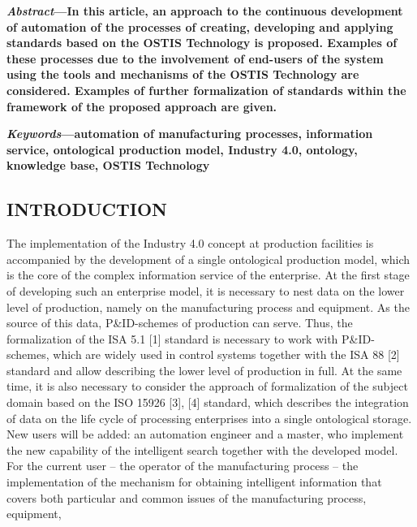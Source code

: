 \documentclass[12pt]{article}
\begin{document}
\begin{multicols}{2}
\setlength\parindent{1.5em}
\footnotesize{\textbf{\textit{Abstract}—In this article, an approach to the continuous
development of automation of the processes of creating,
developing and applying standards based on the OSTIS
Technology is proposed. Examples of these processes due
to the involvement of end-users of the system using the tools
and mechanisms of the OSTIS Technology are considered.
Examples of further formalization of standards within the
framework of the proposed approach are given.}
\par
\setlength\parindent{1.5em}
\textbf{\textit{Keywords}—automation of manufacturing processes, information service, ontological production model, Industry
4.0, ontology, knowledge base, OSTIS Technology}}

\vspace{-0.4cm}
\begin{center}
   \section{\small INTRODUCTION} 
\end{center}
\vspace{-0.40cm}

\normalsize{The implementation of the Industry 4.0 concept at
production facilities is accompanied by the development
of a single ontological production model, which is the core
of the complex information service of the enterprise. At
the first stage of developing such an enterprise model, it
is necessary to nest data on the lower level of production,
namely on the manufacturing process and equipment. As
the source of this data, P&ID-schemes of production
can serve. Thus, the formalization of the ISA 5.1 [1]
standard is necessary to work with P&ID-schemes, which
are widely used in control systems together with the ISA
88 [2] standard and allow describing the lower level of
production in full. At the same time, it is also necessary
to consider the approach of formalization of the subject
domain based on the ISO 15926 [3], [4] standard, which
describes the integration of data on the life cycle of
processing enterprises into a single ontological storage.
New users will be added: an automation engineer and a
master, who implement the new capability of the intelligent search together with the developed model. For the
current user – the operator of the manufacturing process
– the implementation of the mechanism for obtaining
intelligent information that covers both particular and
common issues of the manufacturing process, equipment,}


\end{multicols}
\end{document}
